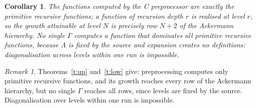 \documentclass[10pt]{article}
\newtheorem{corollary}[theorem]{Corollary}
\theoremstyle{definition}
\theoremstyle{remark}
\newtheorem{remark}[theorem]{Remark}
\begin{document}
\begin{corollary}
The functions computed by the C preprocessor are \emph{exactly} the primitive recursive functions; a function of recursion
depth $r$ is realised at level $r$, so the growth attainable at level $N$ is precisely row $N{+}2$ of the Ackermann
hierarchy. No single $\Gamma$ computes a function that dominates all primitive recursive functions, because $\Lambda$ is
fixed by the source and expansion creates no definitions: diagonalisation across levels within one run is impossible.
\end{corollary}

\begin{remark}
Theorems~\ref{t:up} and~\ref{t:low} give: preprocessing computes only primitive recursive functions, and its growth
reaches every row of the Ackermann hierarchy, but no single $\Gamma$ reaches all rows, since levels are fixed by the
source. Diagonalisation over levels within one run is impossible.
\end{remark}
\end{document}
